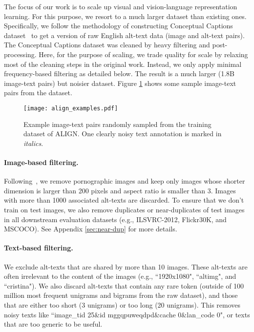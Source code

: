 \documentclass{article}
\begin{document}
The focus of our work is to scale up visual and vision-language representation learning. For this purpose, we resort to a much larger dataset than existing ones. Specifically, we follow the methodology of constructing Conceptual Captions dataset~\cite{sharma:cc3m} to get a version of raw English alt-text data (image and alt-text pairs). The Conceptual Captions dataset was cleaned by heavy filtering and post-processing. Here, for the purpose of scaling, we trade quality for scale by relaxing most of the cleaning steps in the original work. Instead, we only apply minimal frequency-based filtering as detailed below. The result is a much larger (1.8B image-text pairs) but noisier dataset. 
Figure \ref{fig:examples} shows some sample image-text pairs from the dataset.

\begin{figure}[!htb]
\begin{center}
    \centerline{\texttt{[image: align\_examples.pdf]}}
    \vskip -0.1in
    \caption{Example image-text pairs randomly sampled from the training dataset of ALIGN. One clearly noisy text annotation is marked in \textit{italics}.}
    \label{fig:examples}
    \vskip -0.2in
\end{center}
\end{figure}
\vspace{-2mm}
\paragraph{Image-based filtering.} Following~\citet{sharma:cc3m}, we remove pornographic images and keep only images whose shorter dimension is larger than 200 pixels and aspect ratio is smaller than 3. Images with more than 1000 associated alt-texts are discarded. To ensure that we don't train on test images, we also remove duplicates or near-duplicates of test images in all downstream evaluation datasets (e.g., ILSVRC-2012, Flickr30K, and MSCOCO). See Appendix \ref{sec:near-dup} for more details.

\paragraph{Text-based filtering.} We exclude alt-texts that are shared by more than 10 images. These alt-texts are often irrelevant to the content of the images (e.g., ``1920x1080", ``alt\textunderscore img", and ``cristina"). We also discard alt-texts that contain any rare token (outside of 100 million most frequent unigrams and bigrams from the raw dataset), and those that are either too short (3 unigrams) or too long (20 unigrams). This removes noisy texts like ``image\_tid 25\&id mggqpuweqdpd\&cache 0\&lan\_code 0", or texts that are too generic to be useful.
\vspace{-2mm}
\end{document}
